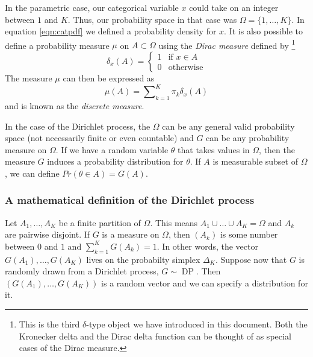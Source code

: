 \documentclass[final,3p,times,twocolumn]{elsarticle}
\DeclareMathOperator*{\DP}{DP}
\begin{document}
In the parametric case, our categorical variable $x$ could take on an integer between $1$ and $K$.
Thus, our probability space in that case was $\Omega = \{1,\dots,K\}$.
In equation \ref{eqn:catpdf} we defined a probability density for $x$.
It is also possible to define a probability measure $\mu$ on $A \subset \Omega$ using the \emph{Dirac measure} defined by
\footnote{This is the third $\delta$-type object we have introduced in this document.
Both the Kronecker delta and the Dirac delta function can be thought of as special cases of the Dirac measure.}
\begin{equation}
\label{eqn:diracmeasure}
\delta_x(A) = \left\{ \begin{array}{lr}
1 & \mbox{if $x \in A$} \\
0 & \mbox{otherwise}
\end{array} \right.
\end{equation}
The measure $\mu$ can then be expressed as 
\begin{equation}
\label{eqn:discretemeasure}
\mu(A) = \sum\nolimits_{k=1}^K \pi_k \delta_x (A)
\end{equation}
and is known as the \emph{discrete measure}. 

In the case of the Dirichlet process, the $\Omega$ can be any general valid probability space (not necessarily finite or even countable) and $G$ can be any probability measure on $\Omega$.
If we have a random variable $\theta$ that takes values in $\Omega$, then the measure $G$ induces a probability distribution for $\theta$.
If $A$ is measurable subset of $\Omega$, we can define $Pr(\theta \in A) = G(A)$.

\subsubsection*{\normalfont \small \bfseries A mathematical definition of the Dirichlet process}
Let $A_1,\dots,A_K$ be a finite partition of $\Omega$.
This means $A_1 \cup \dots \cup A_K = \Omega$ and $A_k$ are pairwise disjoint.
If $G$ is a measure on $\Omega$, then $(A_k)$ is some number between $0$ and $1$ and $\sum_{k=1}^K G(A_k) = 1$.
In other words, the vector $G(A_1),\dots,G(A_K)$ lives on the probabilty simplex $\Delta_K$.
Suppose now that $G$ is randomly drawn from a Dirichlet process, $G \sim \DP$.
Then $(G(A_1),\dots,G(A_K))$ is a random vector and we can specify a distribution for it.
\end{document}
